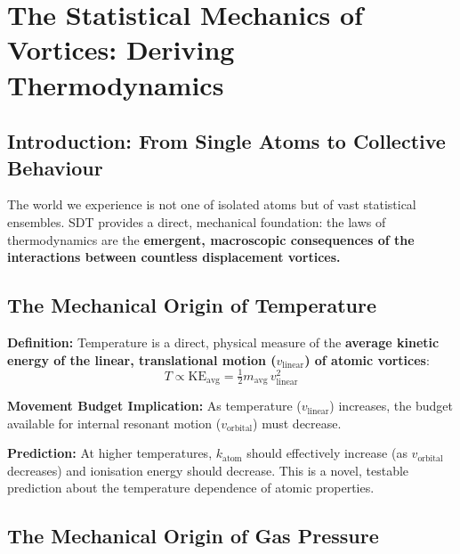 \chapter{The Statistical Mechanics of Vortices: Deriving Thermodynamics}

\author{James Tyndall}

\section{Introduction: From Single Atoms to Collective Behaviour}

The world we experience is not one of isolated atoms but of vast statistical ensembles.  SDT provides a direct, mechanical foundation: the laws of thermodynamics are the \textbf{emergent, macroscopic consequences of the interactions between countless displacement vortices.}


\section{The Mechanical Origin of Temperature}

\textbf{Definition:} Temperature is a direct, physical measure of the \textbf{average kinetic energy of the linear, translational motion ($v_{\text{linear}}$) of atomic vortices}:
\begin{equation}\label{eq:temp}
  T \propto \text{KE}_{\text{avg}} = \tfrac{1}{2}m_{\text{avg}}\,v_{\text{linear}}^2
\end{equation}

\textbf{Movement Budget Implication:} As temperature ($v_{\text{linear}}$) increases, the budget available for internal resonant motion ($v_{\text{orbital}}$) must decrease.

\textbf{Prediction:} At higher temperatures, $k_{\text{atom}}$ should effectively increase (as $v_{\text{orbital}}$ decreases) and ionisation energy should decrease.  This is a novel, testable prediction about the temperature dependence of atomic properties.


\section{The Mechanical Origin of Gas Pressure}

